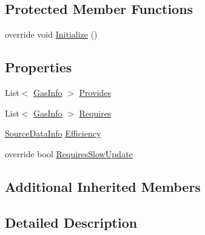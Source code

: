 \subsection*{Protected Member Functions}
\begin{DoxyCompactItemize}
\item 
override void \hyperlink{class_project_porcupine_1_1_buildable_1_1_components_1_1_gas_connection_a1eab83807e81517d9defd25ab97bf9a0}{Initialize} ()
\end{DoxyCompactItemize}
\subsection*{Properties}
\begin{DoxyCompactItemize}
\item 
List$<$ \hyperlink{class_project_porcupine_1_1_buildable_1_1_components_1_1_gas_connection_1_1_gas_info}{Gas\+Info} $>$ \hyperlink{class_project_porcupine_1_1_buildable_1_1_components_1_1_gas_connection_aa5c516ef2c5788eb967a59623614f86e}{Provides}
\item 
List$<$ \hyperlink{class_project_porcupine_1_1_buildable_1_1_components_1_1_gas_connection_1_1_gas_info}{Gas\+Info} $>$ \hyperlink{class_project_porcupine_1_1_buildable_1_1_components_1_1_gas_connection_a81561a378396e94559574122e001ad99}{Requires}
\item 
\hyperlink{class_project_porcupine_1_1_buildable_1_1_components_1_1_buildable_component_1_1_source_data_info}{Source\+Data\+Info} \hyperlink{class_project_porcupine_1_1_buildable_1_1_components_1_1_gas_connection_aa998536b04ebae958c0ee3a44843bc9c}{Efficiency}
\item 
override bool \hyperlink{class_project_porcupine_1_1_buildable_1_1_components_1_1_gas_connection_a6270a7966ca59cf4826eeb70183044f4}{Requires\+Slow\+Update}
\end{DoxyCompactItemize}
\subsection*{Additional Inherited Members}


\subsection{Detailed Description}


